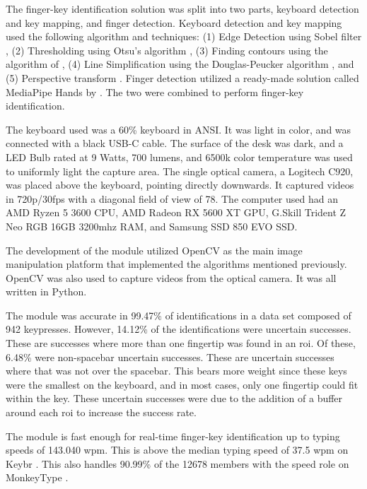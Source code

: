\documentclass{report}
\begin{document}
The finger-key identification solution was split into two parts, keyboard
detection and key mapping, and finger detection. Keyboard detection and key
mapping used the following algorithm and techniques: (1) Edge Detection using
Sobel filter \parencite{sobel2014}, (2) Thresholding using Otsu's algorithm
\parencite{otsu}, (3) Finding contours using the algorithm of \cite{contours},
(4) Line Simplification using the Douglas-Peucker algorithm
\parencite{douglas-peucker}, and (5) Perspective transform
\parencite{opencv-image-transform}. Finger detection utilized a ready-made
solution called MediaPipe Hands by \cite{mediapipe}. The two were combined to
perform finger-key identification.

The keyboard used was a 60\% keyboard in ANSI. It was light in color, and was
connected with a black USB-C cable. The surface of the desk was dark, and a LED
Bulb rated at 9 Watts, 700 lumens, and 6500k color temperature was used to
uniformly light the capture area. The single optical camera, a Logitech C920,
was placed above the keyboard, pointing directly downwards. It captured videos
in 720p/30fps with a diagonal field of view of 78\degree \parencite{logitech}.
The computer used had an AMD Ryzen 5 3600 CPU, AMD Radeon RX 5600 XT GPU,
G.Skill Trident Z Neo RGB 16GB 3200mhz RAM, and Samsung SSD 850 EVO SSD.

The development of the module utilized OpenCV as the main image manipulation
platform that implemented the algorithms mentioned previously. OpenCV was also
used to capture videos from the optical camera. It was all written in Python.

The module was accurate in 99.47\% of identifications in a data set composed of
942 keypresses. However, 14.12\% of the identifications were uncertain
successes. These are successes where more than one fingertip was found in an
\ac{roi}. Of these, 6.48\% were non-spacebar uncertain successes. These are
uncertain successes where that was not over the spacebar. This bears more weight
since these keys were the smallest on the keyboard, and in most cases, only one
fingertip could fit within the key. These uncertain successes were due to the
addition of a buffer around each \ac{roi} to increase the success rate.

The module is fast enough for real-time finger-key identification up to typing
speeds of 143.040 \ac{wpm}. This is above the median typing speed of 37.5
\ac{wpm} on Keybr \parencite{keybr}. This also handles 90.99\% of the 12678
members with the speed role on MonkeyType \parencite{monkey-stats}.
\end{document}
